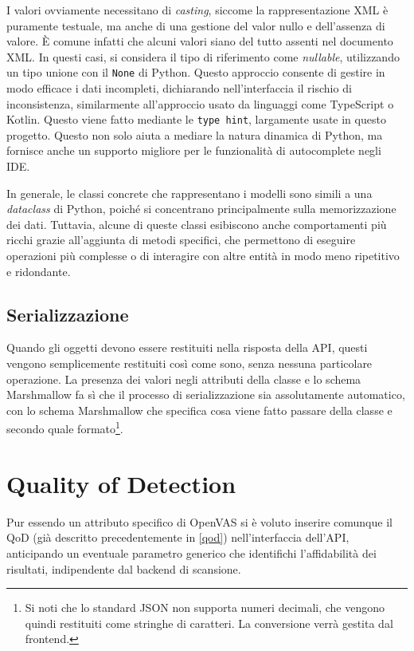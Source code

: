I valori ovviamente necessitano di \emph{casting}, siccome la rappresentazione XML è puramente testuale, ma anche di una gestione del valor nullo e dell'assenza di valore. È comune infatti che alcuni valori siano del tutto assenti nel documento XML. In questi casi, si considera il tipo di riferimento come \emph{nullable}, utilizzando un tipo unione con il \texttt{None} di Python. Questo approccio consente di gestire in modo efficace i dati incompleti, dichiarando nell'interfaccia il rischio di inconsistenza, similarmente all'approccio usato da linguaggi come TypeScript o Kotlin. Questo viene fatto mediante le \texttt{type hint}, largamente usate in questo progetto. Questo non solo aiuta a mediare la natura dinamica di Python, ma fornisce anche un supporto migliore per le funzionalità di autocomplete negli IDE.

In generale, le classi concrete che rappresentano i modelli sono simili a una \emph{dataclass} di Python, poiché si concentrano principalmente sulla memorizzazione dei dati. Tuttavia, alcune di queste classi esibiscono anche comportamenti più ricchi grazie all'aggiunta di metodi specifici, che permettono di eseguire operazioni più complesse o di interagire con altre entità in modo meno ripetitivo e ridondante.

\subsection{Serializzazione}
Quando gli oggetti devono essere restituiti nella risposta della API, questi vengono semplicemente restituiti così come sono, senza nessuna particolare operazione. La presenza dei valori negli attributi della classe e lo schema Marshmallow fa sì che il processo di serializzazione sia assolutamente automatico, con lo schema Marshmallow che specifica cosa viene fatto passare della classe e secondo quale formato\footnote{Si noti che lo standard JSON non supporta numeri decimali, che vengono quindi restituiti come stringhe di caratteri. La conversione verrà gestita dal frontend.}.

\section{Quality of Detection}
Pur essendo un attributo specifico di OpenVAS si è voluto inserire comunque il QoD (già descritto precedentemente in \ref{qod}) nell'interfaccia dell'API, anticipando un eventuale parametro generico che identifichi l'affidabilità dei risultati, indipendente dal backend di scansione.


